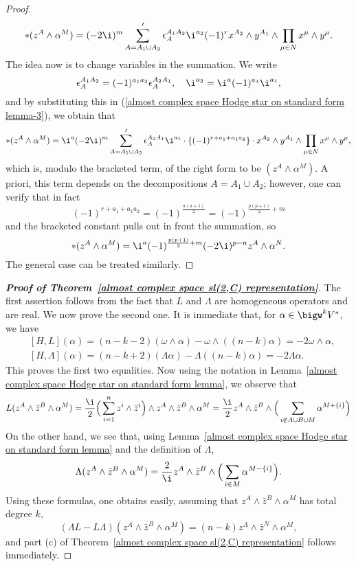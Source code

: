 \begin{proof}
\begin{align}\label{almost complex space Hodge star on standard form lemma-3}
\ast(z^A\wedge\alpha^M)=(-2\i)^m\sum'_{A=A_1\cup A_2}\epsilon_A^{A_1A_2}\i^{a_2}(-1)^rx^{A_2}\wedge y^{A_1}\wedge\prod_{\mu\in N}x^\mu\wedge y^\mu.
\end{align}
The idea now is to change variables in the summation. We write
\[\epsilon_A^{A_1A_2}=(-1)^{a_1a_2}\epsilon_A^{A_2A_1},\quad \i^{a_2}=\i^a(-1)^{a_1}\i^{a_1},\]
and by substituting this in (\ref{almost complex space Hodge star on standard form lemma-3}), we obtain that
\begin{align*}
\ast(z^A\wedge\alpha^M)=\i^a(-2\i)^m\sum'_{A=A_1\cup A_2}\epsilon_A^{A_2A_1}\i^{a_1}\cdot\{(-1)^{r+a_1+a_1a_2}\}\cdot x^{A_2}\wedge y^{A_1}\wedge\prod_{\mu\in N}x^\mu\wedge y^\mu,
\end{align*}
which is, modulo the bracketed term, of the right form to be $(z^A\wedge\alpha^M)$. A priori, this term depends on the decompositions $A=A_1\cup A_2$; however, one can verify that in fact
\[(-1)^{r+a_1+a_1a_2}=(-1)^{\frac{a(a+1)}{2}}=(-1)^{\frac{p(p+1)}{2}+m}\]
and the bracketed constant pulls out in front the summation, so
\[\ast(z^A\wedge\alpha^M)=\i^a(-1)^{\frac{p(p+1)}{2}+m}(-2\i)^{p-n}z^A\wedge\alpha^N.\]
The general case can be treated similarly.
\end{proof}
\begin{proof}[\textbf{Proof of Theorem~\ref{almost complex space sl(2,C) representation}}]
The first assertion follows from the fact that $L$ and $\Lambda$ are homogeneous operators and are real. We now prove the second one. It is immediate that, for $\alpha\in\bigw^kV^*$, we have
\begin{align*}
&[H,L](\alpha)=(n-k-2)(\omega\wedge\alpha)-\omega\wedge((n-k)\alpha)=-2\omega\wedge\alpha,\\
&[H,\Lambda](\alpha)=(n-k+2)(\Lambda\alpha)-\Lambda((n-k)\alpha)=-2\Lambda\alpha.
\end{align*}
This proves the first two equalities. Now using the notation in Lemma~\ref{almost complex space Hodge star on standard form lemma}, we observe that
\begin{align*}
L(z^A\wedge\bar{z}^B\wedge\alpha^M)=\frac{\i}{2}\Big(\sum_{i=1}^{n}z^i\wedge\bar{z}^i\Big)\wedge z^A\wedge\bar{z}^B\wedge\alpha^M=\frac{\i}{2}z^A\wedge\bar{z}^B\wedge\Big(\sum_{i\notin A\cup B\cup M}\alpha^{M+\{i\}}\Big)
\end{align*}
On the other hand, we see that, using Lemma~\ref{almost complex space Hodge star on standard form lemma} and the definition of $\Lambda$,
\begin{align*}
\Lambda(z^A\wedge\bar{z}^B\wedge\alpha^M)=\frac{2}{\i}z^A\wedge\bar{z}^B\wedge\Big(\sum_{i\in M}\alpha^{M-\{i\}}\Big).
\end{align*}
Using these formulas, one obtains easily, assuming that $z^A\wedge\bar{z}^B\wedge\alpha^M$ has total degree $k$,
\[(\Lambda L-L\Lambda)(z^A\wedge\bar{z}^B\wedge\alpha^M)=(n-k)z^A\wedge\bar{z}^N\wedge\alpha^M,\]
and part (c) of Theorem~\ref{almost complex space sl(2,C) representation} follows immediately.
\end{proof}
